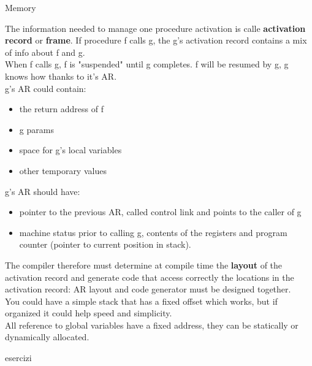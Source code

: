 \documentclass[12pt]{article}
\begin{document}
Memory \\

The information needed to manage one procedure activation is calle \textbf{activation record} or \textbf{frame}. If procedure f calls g, the g's activation record contains a mix of info about f and g.
\\ When f calls g, f is "suspended" until g completes. f will be resumed by g, g knows how thanks to it's AR.
\\ g's AR could contain:
\begin{itemize}
    \item the return address of f
    \item g params
    \item space for g's local variables
    \item other temporary values
\end{itemize}
g's AR should have: 
\begin{itemize}
    \item pointer to the previous AR, called control link and points to the caller of g
    \item machine status prior to calling g, contents of the registers and program counter (pointer to current position in stack).
\end{itemize}
The compiler therefore must determine at compile time the \textbf{layout} of the activation record and generate code that access correctly the locations in the activation record: AR layout and code generator must be designed together.
\\ You could have a simple stack that has a fixed offset which works, but if organized it could help speed and simplicity.
\\ All reference to global variables have a fixed address, they can be statically or dynamically allocated.
\\

\newpage
{esercizi}
\end{document}
